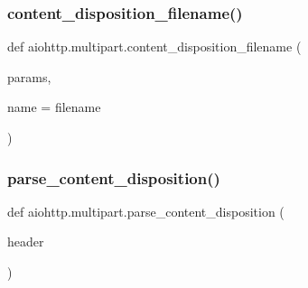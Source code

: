 \subsubsection{\texorpdfstring{content\+\_\+disposition\+\_\+filename()}{content\_disposition\_filename()}}
{\footnotesize\ttfamily def aiohttp.\+multipart.\+content\+\_\+disposition\+\_\+filename (\begin{DoxyParamCaption}\item[{}]{params,  }\item[{}]{name = {\ttfamily \textquotesingle{}filename\textquotesingle{}} }\end{DoxyParamCaption})}

\mbox{\label{namespaceaiohttp_1_1multipart_a49b6573a2d732ccf8a5c491d003b60bc}} 
\subsubsection{\texorpdfstring{parse\+\_\+content\+\_\+disposition()}{parse\_content\_disposition()}}
{\footnotesize\ttfamily def aiohttp.\+multipart.\+parse\+\_\+content\+\_\+disposition (\begin{DoxyParamCaption}\item[{}]{header }\end{DoxyParamCaption})}

